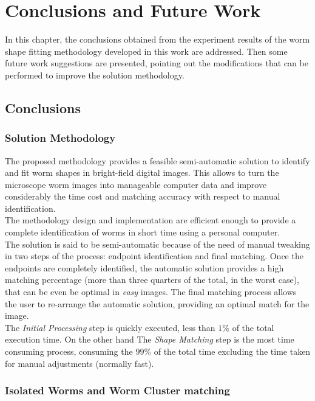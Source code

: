 \thispagestyle{empty}
\cleardoublepage
\chapter{Conclusions and Future Work}

In this chapter, the conclusions obtained from the experiment results of the 
worm shape fitting methodology developed in this work are addressed.
Then some future work suggestions are presented, pointing out the modifications
that can be performed to improve the solution methodology.

\section{Conclusions}

\subsection*{Solution Methodology}

The proposed methodology provides a feasible semi-automatic solution
to identify and fit worm shapes in bright-field digital images. This allows
to turn the microscope worm images into manageable computer data and 
improve considerably the time cost and matching accuracy with respect
to manual identification.\\
The methodology design and implementation are efficient enough to provide
a complete identification of worms in short time using a personal computer.\\
The solution is said to be semi-automatic because of the need of manual
tweaking in two steps of the process: endpoint identification and
final matching. Once the endpoints are completely identified, the automatic
solution provides a high matching percentage (more than three quarters of 
the total, in the worst case), that can be even be optimal in \emph{easy} 
images. The final matching process allows the user to re-arrange the 
automatic solution, providing an optimal match for the image.\\
The \emph{Initial Processing} step is quickly executed, less than
$1\%$ of the total execution time. On the other hand The \emph{Shape Matching}
step is the most time consuming process, consuming the $99\%$ of the total
time excluding the time taken for manual adjustments (normally fast).

\subsection*{Isolated Worms and Worm Cluster matching}

